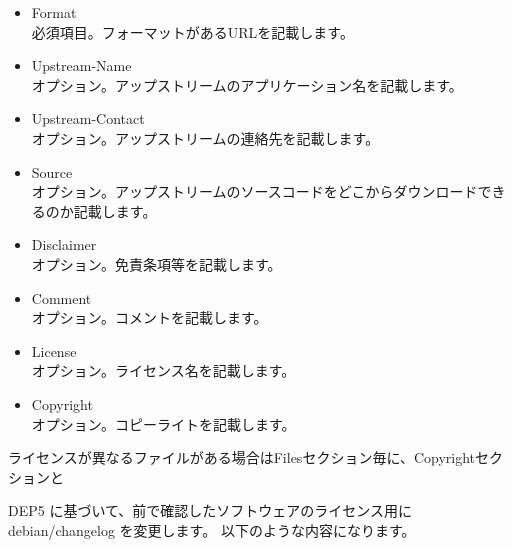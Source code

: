\documentclass[mingoth,a4paper]{jsarticle}
\begin{document}
\begin{itemize}
\item Format\\
必須項目。フォーマットがあるURLを記載します。
\item Upstream-Name\\
オプション。アップストリームのアプリケーション名を記載します。
\item Upstream-Contact\\
オプション。アップストリームの連絡先を記載します。
\item Source\\
オプション。アップストリームのソースコードをどこからダウンロードできるのか記載します。
\item Disclaimer\\
オプション。免責条項等を記載します。
\item Comment\\
オプション。コメントを記載します。
\item License\\
オプション。ライセンス名を記載します。
\item Copyright\\
オプション。コピーライトを記載します。
\end{itemize}

ライセンスが異なるファイルがある場合はFilesセクション毎に、Copyrightセクションと
\fi


DEP5 に基づいて、前で確認したソフトウェアのライセンス用に debian/changelog を変更します。
以下のような内容になります。
\end{document}
